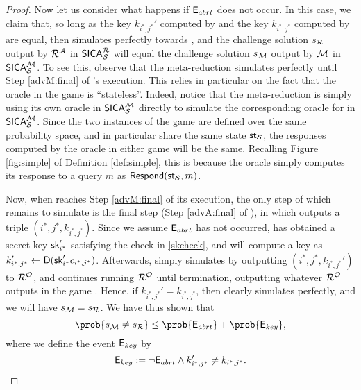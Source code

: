 \begin{proof}
  Now let us consider what happens if \(\mathsf{E}_{abrt}\) does not occur.
  In this case, we claim that, so long as the key
  \(k_{i^{*},j^{*}}'\) computed by \redM
  and the key \(k_{i^{*},j^{*}}\) computed by \advA are equal,
  then \redM simulates \advA perfectly towards \redR,
  and the challenge solution \(s_{\redR}\) output by \(\redR^{\advA}\) in \(\SICA_{\Simple}^{\redR}\)
  will equal the challenge solution \(s_{\mathcal{M}}\) output by \(\mathcal{M}\)
  in \(\mathsf{SICA}_{\mathcal{S}}^{\mathcal{M}}\).
  To see this, observe that the meta-reduction \redM simulates \advA
  perfectly until Step \ref{advM:final} of \redM's execution.
  This relies in particular on the fact that the oracle \oracle
  in the \SICA game is ``stateless''.
  Indeed, notice that the meta-reduction \redM is simply
  using its own oracle \oracle in \(\mathsf{SICA}_{\mathcal{S}}^{\mathcal{M}}\)
  directly to simulate the corresponding oracle for \redR in \(\mathsf{SICA}_{\mathcal{S}}^{\mathcal{M}}\).
  Since the two instances of the \SICA game are defined over the same probability space,
  and in particular share the same state \(\mathsf{st}_{\mathcal{S}}\),
  the responses computed by the oracle \oracle
  in either game will be the same.
  Recalling Figure \ref{fig:simple} of Definition \ref{def:simple},
  this is because the oracle \oracle simply computes its response to a query \(m\)
  as \(\mathsf{Respond}(\mathsf{st}_{\mathcal{S}},m)\).

  Now, when \redM reaches Step \ref{advM:final} of its execution,
  the only step of \advA which remains to simulate is the
  final step (Step \ref{advA:final} of \advA), in which \advA outputs
  a triple \((i^{*},j^{*},k_{i^{*},j^{*}})\).
  Since we assume \(\mathsf{E}_{abrt}\) has not occurred,
  \redM has obtained a secret key \(\mathsf{sk}_{i^{*}}'\)
  satisfying the check in \eqref{skcheck},
  and will compute a key as \(k_{i^{*},{j^{*}}}' \leftarrow \mathsf{D}(\mathsf{sk}_{i^{*}}'c_{i^{*},j^{*}})\).
  Afterwards, \redM simply simulates \advA
  by outputting \((i^{*},j^{*}, k_{i^{*},j^{*}}')\) to \(\redR^{\oracle}\),
  and continues running \(\redR^{\oracle}\)
  until termination, outputting whatever \(\redR^{\oracle}\)
  outputs in the game \SICA.
  Hence, if \(k_{i^{*},j^{*}}' = k_{i^{*},j^{*}}\),
  then clearly \redM simulates \advA perfectly,
  and we will have \(s_{\redM} = s_{\redR}\).
  We have thus shown that
  \[
    \prob{s_{\redM} \ne s_{\redR}} \le \prob{\eventE_{abrt}} + \prob{\eventE_{key}},
  \]
  where we define the event \(\mathsf{E}_{key}\) by
  \[
    \mathsf{E}_{key} := \neg \mathsf{E}_{abrt} \land k_{i^{*},j^{*}}' \ne k_{i^{*},j^{*}}.
  \]


\end{proof}
